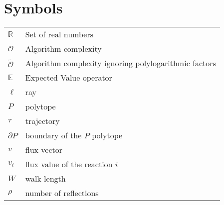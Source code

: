 \documentclass[master=elt, cleveref, autoref, masteroption=eg]{kulemt}
\def\RR{{\mathbb R}}
\newcommand{\OO}{\mathcal{O}\xspace}
\newcommand{\sO}{\widetilde{\mathcal{O}}\xspace}
\begin{document}
\section*{Symbols}
   \begin{flushleft}
   \renewcommand{\arraystretch}{1.1}
   \begin{tabularx}{\textwidth}{@{}p{12mm}X@{}}
      $\RR$          & Set of real numbers\\
      $\OO$          & Algorithm complexity\\
      $\sO$          & Algorithm complexity ignoring polylogarithmic factors\\
      $\mathbb{E}$   & Expected Value operator\\
      $\ell$         & ray\\
      $P$            & polytope\\
      $\tau$         & trajectory\\
      $\partial P$   & boundary of the $P$ polytope\\
      $v$            & flux vector\\
      $v_i$          & flux value of the reaction $i$\\
      $W$            & walk length\\
      $\rho$         & number of reflections\\
   \end{tabularx}
\end{flushleft}


\mainmatter

















\appendixpage*          
\appendix




\backmatter 







\end{document}
